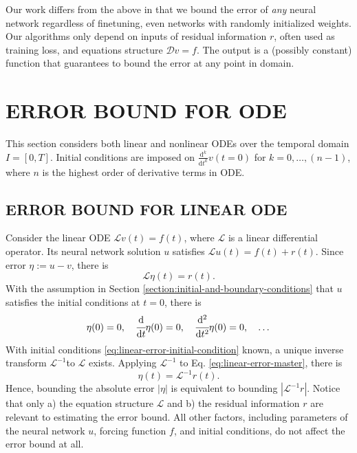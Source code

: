 \documentclass[accepted]{uai2023}
\newcommand{\dt}[1]{\cfrac{\mathrm{d} #1}{\mathrm{d} t}}
\newcommand{\dnt}[2]{\cfrac{\mathrm{d}^{#1} #2}{\mathrm{d} t^{#1}}}
\newcommand{\Err}{\eta}
\renewcommand{\L}{\mathcal{L}}
\begin{document}
    Our work differs from the above in that we bound the error of \textit{any} neural network regardless of finetuning, even networks with randomly initialized weights.
    Our algorithms only depend on inputs of residual information $r$, often used as training loss, and equations structure $\mathcal{D} v = f$.
    The output is a (possibly constant) function that guarantees to bound the error at any point in domain.

\section{ERROR BOUND FOR ODE}  \label{section:error-bound-for-ode}
    This section considers both linear and nonlinear ODEs over the temporal domain $I=[0, T]$. 
    Initial conditions are imposed on $\frac{\mathrm{d}^k}{\mathrm{d}t^k}v(t=0)$ for $k = 0, \dots, (n - 1)$, where $n$ is the highest order of derivative terms in ODE.

\subsection{ERROR BOUND FOR LINEAR ODE}\label{section:error-bound-for-linear-odes}
    Consider the linear ODE $\L v(t) = f(t)$, where $\L$ is a linear differential operator. 
    Its neural network solution $u$ satisfies $\L u(t) = f(t) + r(t)$. 
    Since error $\Err := u - v$, there is
    {   
        \small
        \begin{equation} \label{eq:linear-error-master}
            \L \Err(t) = r(t).
        \end{equation}
    }
    With the assumption in Section \ref{section:initial-and-boundary-conditions} that $u$ satisfies the initial conditions at $t=0$, there is
    {
        \small
        \begin{equation} \label{eq:linear-error-initial-condition}
            \Err(0) = 0, \quad \dt{}{}\Err(0) = 0, \quad \dnt{2}{}\Err(0) = 0, \quad \dots 
        \end{equation}
    }
    With initial conditions \ref{eq:linear-error-initial-condition} known, a unique inverse transform $\L^{-1}$to $\L$ exists. 
    Applying $\L^{-1}$ to Eq. \ref{eq:linear-error-master}, there is 
    {
        \small
        \begin{equation}\label{eq:linear-error-inverse-master}
            \Err(t) = \L^{-1} r(t).
        \end{equation}
    }
    Hence, bounding the absolute error $\left|\Err\right|$ is equivalent to bounding $\left|\L^{-1} r\right|$. 
    Notice that only a) the equation structure $\L$ and b) the residual information $r$ are relevant to estimating the error bound. 
    All other factors, including parameters of the neural network $u$, forcing function $f$, and initial conditions, do not affect the error bound at all.
\end{document}
